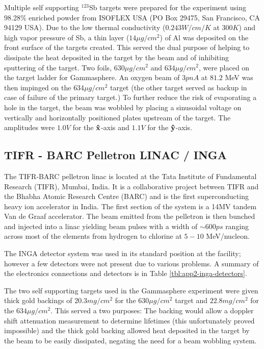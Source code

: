 Multiple self supporting $^{123}$Sb targets were prepared for the experiment using 98.28\% enriched powder from ISOFLEX USA (PO Box 29475, San Francisco, CA 94129 USA)\cite{sbTargets}. Due to the low thermal conductivity ($0.243W/cm/K$ at $300K$\cite{thermalCond}) and high vapor pressure\cite{sbPartialP,sbTargets} of Sb, a thin layer ($14\mu{}g/cm^2$) of Al was deposited on the front surface of the targets created. This served the dual purpose of helping to dissipate the heat deposited in the target by the beam and of inhibiting sputtering of the target. Two foils, $630\mu{}g/cm^2$ and $634\mu{}g/cm^2$, were placed on the target ladder for Gammasphere. An oxygen beam of $3pnA$ at $81.2$ MeV was then impinged on the $634\mu{}g/cm^2$ target (the other target served as backup in case of failure of the primary target.) To further reduce the risk of evaporating a hole in the target, the beam was wobbled by placing a sinusoidal voltage on vertically and horizontally positioned plates upstream of the target. The amplitudes were $1.0V$ for the $\boldsymbol{\hat{\textbf{x}}}$-axis and $1.1V$ for the $\boldsymbol{\hat{\textbf{y}}}$-axis.

\subsection{TIFR - BARC Pelletron LINAC / INGA}
\label{ssec:exp-pr-details-inga}
The TIFR-BARC pelletron linac is located at the Tata Institute of Fundamental Research (TIFR), Mumbai, India. It is a collaborative project between TIFR and the Bhabha Atomic Research Centre (BARC) and is the first superconducting heavy ion accelerator in India. The first section of the system is a 14MV tandem Van de Graaf accelerator. The beam emitted from the pelletron is then bunched and injected into a linac yielding beam pulses with a width of $\sim{}600ps$ ranging across most of the elements from hydrogen to chlorine at $5-10$ MeV/nucleon.

The INGA detector system was used in its standard position at the facility; however a few detectors were not present due to various problems. A summary of the electronics connections and detectors is in Table \ref{tbl:app2-inga-detectors}.

The two self supporting targets used in the Gammasphere experiment were given thick gold backings of $20.3mg/cm^2$ for the $630\mu{}g/cm^2$ target and $22.8mg/cm^2$ for the $634\mu{}g/cm^2$\cite{sbTargets}. This served a two purposes: The backing would allow a doppler shift attenuation measurement to determine lifetimes (this unfortunately proved impossible) and the thick gold backing allowed heat deposited in the target by the beam to be easily dissipated, negating the need for a beam wobbling system.

